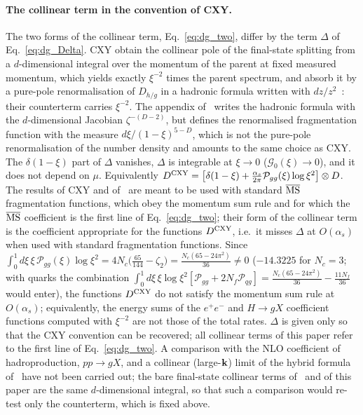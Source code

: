 \paragraph{The collinear term in the convention of CXY.} The two forms of the collinear term, Eq.~\eqref{eq:dg_two}, differ by the term $\Delta$ of Eq.~\eqref{eq:dg_Delta}. CXY obtain the collinear pole of the final-state splitting from a $d$-dimensional integral over the momentum of the parent at fixed measured momentum, which yields exactly $\xi^{-2}$ times the parent spectrum, and absorb it by a pure-pole renormalisation of $D_{h/g}$ in a hadronic formula written with $dz/z^2$~\cite{Chirilli:2012jd}: their counterterm carries $\xi^{-2}$. The appendix of~\cite{Altinoluk:2014eka} writes the hadronic formula with the $d$-dimensional Jacobian $\zeta^{-(D-2)}$, but defines the renormalised fragmentation function with the measure $d\xi/(1-\xi)^{5-D}$, which is not the pure-pole renormalisation of the number density and amounts to the same choice as CXY. The $\delta(1-\xi)$ part of $\Delta$ vanishes, $\Delta$ is integrable at $\xi\to0$ ($\mathcal G_0(\xi)\to0$), and it does not depend on $\mu$. Equivalently $D^{\rm CXY}=\big[\delta(1-\xi)+\frac{\alpha_s}{2\pi}\mathcal P_{gg}(\xi)\log\xi^2\big]\otimes D$. The results of CXY and of~\cite{Altinoluk:2014eka} are meant to be used with standard $\overline{\rm MS}$ fragmentation functions, which obey the momentum sum rule and for which the $\overline{\rm MS}$ coefficient is the first line of Eq.~\eqref{eq:dg_two}; their form of the collinear term is the coefficient appropriate for the functions $D^{\rm CXY}$, i.e.\ it misses $\Delta$ at $O(\alpha_s)$ when used with standard fragmentation functions. Since $\int_0^1d\xi\,\xi\,\mathcal P_{gg}(\xi)\log\xi^2=4N_c\big(\frac{65}{144}-\zeta_2\big)=\frac{N_c(65-24\pi^2)}{36}\neq0$ ($-14.3225$ for $N_c=3$; with quarks the combination $\int_0^1d\xi\,\xi\log\xi^2[\mathcal P_{gg}+2N_f\mathcal P_{qg}]=\frac{N_c(65-24\pi^2)}{36}-\frac{11N_f}{36}$ would enter), the functions $D^{\rm CXY}$ do not satisfy the momentum sum rule at $O(\alpha_s)$; equivalently, the energy sums of the $e^+e^-$ and $H\to gX$ coefficient functions computed with $\xi^{-2}$ are not those of the total rates. $\Delta$ is given only so that the CXY convention can be recovered; all collinear terms of this paper refer to the first line of Eq.~\eqref{eq:dg_two}. A comparison with the NLO coefficient of hadroproduction, $pp\to gX$, and a collinear (large-$\mathbf{k}$) limit of the hybrid formula of~\cite{Chirilli:2012jd} have not been carried out; the bare final-state collinear terms of~\cite{Chirilli:2012jd} and of this paper are the same $d$-dimensional integral, so that such a comparison would re-test only the counterterm, which is fixed above.
